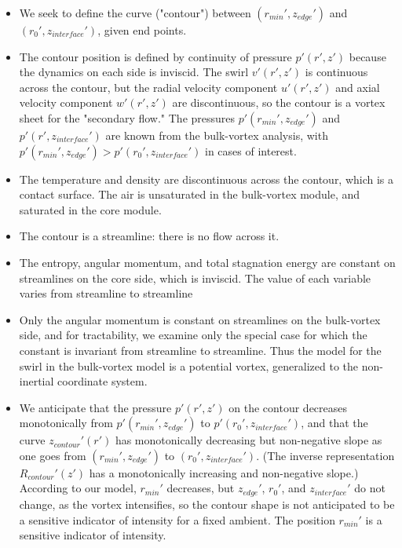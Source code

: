 \documentclass{article}
\begin{document}
\begin{itemize}

\item We seek to define the curve ("contour") between $(r_{min}', z_{edge}')$ and $(r_0', z_{interface}')$, given end points.

\item The contour position is defined by continuity of pressure $p'(r',z')$ because the dynamics on each side is inviscid. The swirl $v'(r',z')$ is continuous across the contour, but the radial velocity component $u'(r',z')$ and axial velocity component $w'(r',z')$ are discontinuous, so the contour is a vortex sheet for the "secondary flow." The pressures $p'(r_{min}',z_{edge}')$ and $p'(r',z_{interface}')$ are known from the bulk-vortex analysis, with $p'(r_{min}',z_{edge}') > p'(r_0',z_{interface}')$ in cases of interest.

\item The temperature and density are discontinuous across the contour, which is a contact surface. The air is unsaturated in the bulk-vortex module, and saturated in the core module.

\item The contour is a streamline: there is no flow across it.

\item The entropy, angular momentum, and total stagnation energy are constant on streamlines on the core side, which is inviscid. The value of each variable varies from streamline to streamline

\item Only the angular momentum is constant on streamlines on the bulk-vortex side, and for tractability, we examine only the special case for which the constant is invariant from streamline to streamline. Thus the model for the swirl in the bulk-vortex model is a potential vortex, generalized to the non-inertial coordinate system.

\item We anticipate that the pressure $p'(r',z')$ on the contour decreases monotonically from $p'(r_{min}',z_{edge}')$ to $p'(r_0',z_{interface}')$, and that the curve $z_{contour}'(r')$ has monotonically decreasing but non-negative slope as one goes from $(r_{min}', z_{edge}')$ to $(r_0', z_{interface}')$. (The inverse representation $R_{contour}'(z')$ has a monotonically increasing and non-negative slope.) According to our model, $r_{min}'$ decreases, but $z_{edge}'$, $r_0'$, and $z_{interface}'$ do not change, as the vortex intensifies, so the contour shape is not anticipated to be a sensitive indicator of intensity for a fixed ambient. The position $r_{min}'$ is a sensitive indicator of intensity.
\end{itemize}
\end{document}
